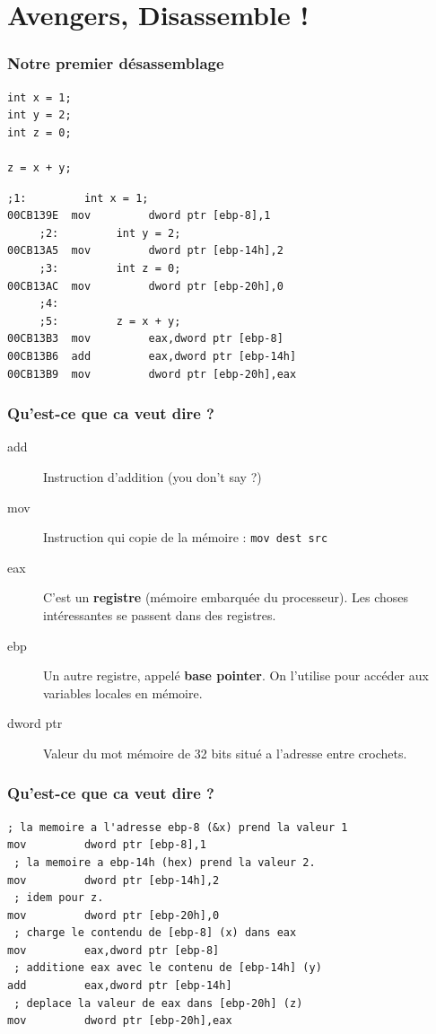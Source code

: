 \documentclass{beamer}
\begin{document}
\section{Avengers, Disassemble !}
\begin{frame}[fragile]
  \frametitle{Notre premier désassemblage}

    \begin{lstlisting}
int x = 1;
int y = 2;
int z = 0;

z = x + y;
    \end{lstlisting}
\pause
    \begin{lstlisting}[language={[x86masm]Assembler}]
     ;1:         int x = 1;
00CB139E  mov         dword ptr [ebp-8],1  
     ;2:         int y = 2;
00CB13A5  mov         dword ptr [ebp-14h],2  
     ;3:         int z = 0;
00CB13AC  mov         dword ptr [ebp-20h],0  
     ;4: 
     ;5:         z = x + y;
00CB13B3  mov         eax,dword ptr [ebp-8]  
00CB13B6  add         eax,dword ptr [ebp-14h]  
00CB13B9  mov         dword ptr [ebp-20h],eax  
    \end{lstlisting}

\end{frame}
\begin{frame} [fragile]
\frametitle{Qu'est-ce que ca veut dire ?}
\begin{description}
\item[add] Instruction d'addition (you don't say ?)
\item[mov] Instruction qui copie de la mémoire : \lstinline[language={[x86masm]Assembler}]+mov dest src+
\item[eax] C'est un \textbf{registre} (mémoire embarquée du processeur). Les choses intéressantes se passent dans des registres.
\item[ebp] Un autre registre, appelé \textbf{base pointer}. On l'utilise pour accéder aux variables locales en mémoire.
\item[dword ptr] Valeur du mot mémoire de 32 bits situé a l'adresse entre crochets.
\end{description}
\end{frame}

\begin{frame} [fragile]
\frametitle{Qu'est-ce que ca veut dire ?}
    \begin{lstlisting}[language={[x86masm]Assembler}]
 ; la memoire a l'adresse ebp-8 (&x) prend la valeur 1
mov         dword ptr [ebp-8],1
 ; la memoire a ebp-14h (hex) prend la valeur 2.
mov         dword ptr [ebp-14h],2
 ; idem pour z. 
mov         dword ptr [ebp-20h],0
 ; charge le contendu de [ebp-8] (x) dans eax 
mov         eax,dword ptr [ebp-8]
 ; additione eax avec le contenu de [ebp-14h] (y)
add         eax,dword ptr [ebp-14h]
 ; deplace la valeur de eax dans [ebp-20h] (z)
mov         dword ptr [ebp-20h],eax
    \end{lstlisting}
\end{frame}
\end{document}
